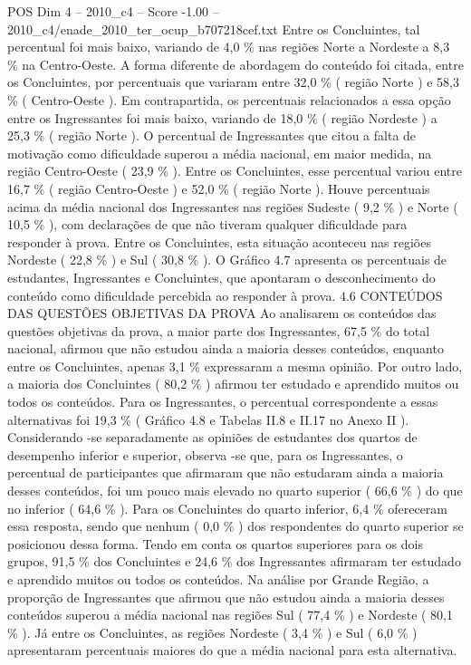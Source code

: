 \begin{textsample}{POS Dim 4 – 2010\_c4 – Score -1.00 – 2010\_c4/enade\_2010\_ter\_ocup\_b707218cef.txt}
Entre os Concluintes, tal percentual foi mais baixo, variando de 4,0 \% nas regiões Norte a Nordeste a 8,3 \% na Centro-Oeste.
A forma diferente de abordagem do conteúdo foi citada, entre os Concluintes, por percentuais que variaram entre 32,0 \% ( região Norte ) e 58,3 \% ( Centro-Oeste ).
Em contrapartida, os percentuais relacionados a essa opção entre os Ingressantes foi mais baixo, variando de 18,0 \% ( região Nordeste ) a 25,3 \% ( região Norte ).
O percentual de Ingressantes que citou a falta de motivação como dificuldade superou a média nacional, em maior medida, na região Centro-Oeste ( 23,9 \% ).
Entre os Concluintes, esse percentual variou entre 16,7 \% ( região Centro-Oeste ) e 52,0 \% ( região Norte ).
Houve percentuais acima da média nacional dos Ingressantes nas regiões Sudeste ( 9,2 \% ) e Norte ( 10,5 \% ), com declarações de que não tiveram qualquer dificuldade para responder à prova.
Entre os Concluintes, esta situação aconteceu nas regiões Nordeste ( 22,8 \% ) e Sul ( 30,8 \% ).
O Gráfico 4.7 apresenta os percentuais de estudantes, Ingressantes e Concluintes, que apontaram o desconhecimento do conteúdo como dificuldade percebida ao responder à prova. 4.6 CONTEÚDOS DAS QUESTÕES OBJETIVAS DA PROVA Ao analisarem os conteúdos das questões objetivas da prova, a maior parte dos Ingressantes, 67,5 \% do total nacional, afirmou que não estudou ainda a maioria desses conteúdos, enquanto entre os Concluintes, apenas 3,1 \% expressaram a mesma opinião.
Por outro lado, a maioria dos Concluintes ( 80,2 \% ) afirmou ter estudado e aprendido muitos ou todos os conteúdos.
Para os Ingressantes, o percentual correspondente a essas alternativas foi 19,3 \% ( Gráfico 4.8 e Tabelas II.8 e II.17 no Anexo II ).
Considerando -se separadamente as opiniões de estudantes dos quartos de desempenho inferior e superior, observa -se que, para os Ingressantes, o percentual de participantes que afirmaram que não estudaram ainda a maioria desses conteúdos, foi um pouco mais elevado no quarto superior ( 66,6 \% ) do que no inferior ( 64,6 \% ).
Para os Concluintes do quarto inferior, 6,4 \% ofereceram essa resposta, sendo que nenhum ( 0,0 \% ) dos respondentes do quarto superior se posicionou dessa forma.
Tendo em conta os quartos superiores para os dois grupos, 91,5 \% dos Concluintes e 24,6 \% dos Ingressantes afirmaram ter estudado e aprendido muitos ou todos os conteúdos.
Na análise por Grande Região, a proporção de Ingressantes que afirmou que não estudou ainda a maioria desses conteúdos superou a média nacional nas regiões Sul ( 77,4 \% ) e Nordeste ( 80,1 \% ).
Já entre os Concluintes, as regiões Nordeste ( 3,4 \% ) e Sul ( 6,0 \% ) apresentaram percentuais maiores do que a média nacional para esta alternativa.

\end{textsample}
